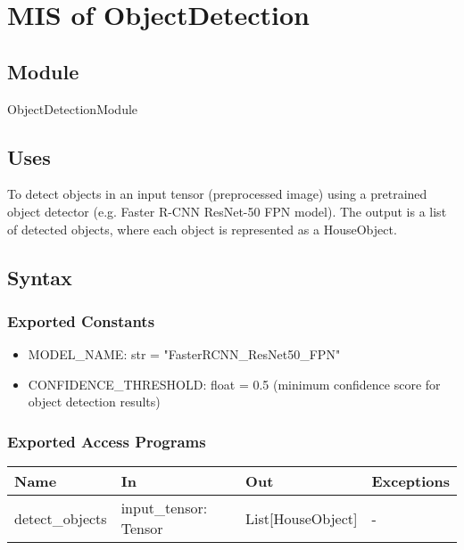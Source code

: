 \documentclass[12pt, titlepage]{article}
\begin{document}
\section{MIS of ObjectDetection} \label{Module} 

\subsection{Module}

ObjectDetectionModule

\subsection{Uses}
To detect objects in an input tensor (preprocessed image) using a pretrained object detector (e.g. Faster R-CNN ResNet-50 FPN model). The output is a list of detected objects, where each object is represented as a HouseObject.

\subsection{Syntax}

\subsubsection{Exported Constants}

\begin{itemize}
  \item MODEL{\_}NAME: str = "FasterRCNN{\_}ResNet50{\_}FPN"
  \item CONFIDENCE{\_}THRESHOLD: float = 0.5 (minimum confidence score for object detection results)
\end{itemize}

\subsubsection{Exported Access Programs}

\begin{center}
\begin{tabular}{p{5cm} p{3cm} p{3cm} p{2cm}}
\hline
\textbf{Name} & \textbf{In} & \textbf{Out} & \textbf{Exceptions} \\
\hline
detect{\_}objects & input{\_}tensor: Tensor & List[HouseObject] & - \\
\hline
\end{tabular}
\end{center}
\end{document}
